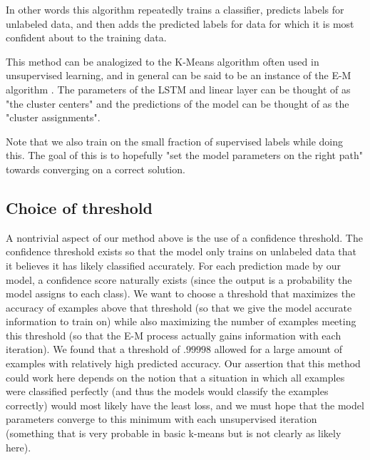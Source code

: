 \documentclass[11pt,letterpaper]{article}
\begin{document}
In other words this algorithm repeatedly trains a classifier, predicts labels for unlabeled data, and then adds the predicted labels for data for which it is most confident about to the training data.

This method can be analogized to the K-Means algorithm often used in unsupervised learning, and in general can be said to be an instance of the E-M algorithm \cite{dempster1977maximum}. The parameters of the LSTM and linear layer can be thought of as "the cluster centers" and the predictions of the model can be thought of as the "cluster assignments".

Note that we also train on the small fraction of supervised labels while doing this. The goal of this is to hopefully "set the model parameters on the right path" towards converging on a correct solution.

\subsection{Choice of threshold}

A nontrivial aspect of our method above is the use of a confidence threshold. The confidence threshold exists so that the model only trains on unlabeled data that it believes it has likely classified accurately. For each prediction made by our model, a confidence score naturally exists (since the output is a probability the model assigns to each class). We want to choose a threshold that maximizes the accuracy of examples above that threshold (so that we give the model accurate information to train on) while also maximizing the number of examples meeting this threshold (so that the E-M process actually gains information with each iteration). We found that a threshold of $.99998$ allowed for a large amount of examples with relatively high predicted accuracy. Our assertion that this method could work here depends on the notion that a situation in which all examples were classified perfectly (and thus the models would classify the examples correctly) would most likely have the least loss, and we must hope that the model parameters converge to this minimum with each unsupervised iteration (something that is very probable in basic k-means but is not clearly as likely here).
\end{document}
